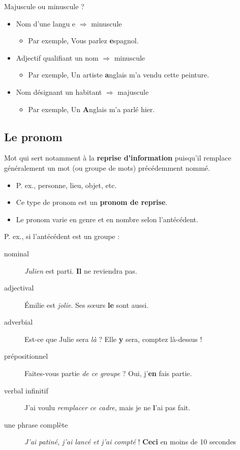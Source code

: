 \documentclass[10pt, french]{article}
\begin{document}
\begin{multicols*}{2}
\begin{definitionNOHFILLsub}
Majuscule ou minuscule ?
\begin{itemize}
	\item	Nom d'une langu	e $\Rightarrow$ minuscule
		\begin{itemize}
		\item	Par exemple, Vous parlez \textbf{e}spagnol.
		\end{itemize}
	\item	Adjectif qualifiant un nom $\Rightarrow$ minuscule
		\begin{itemize}
		\item	Par exemple, Un artiste \textbf{a}nglais m'a vendu cette peinture.
		\end{itemize}
	\item	Nom désignant un habitant $\Rightarrow$ majuscule
		\begin{itemize}
		\item	Par exemple, Un \textbf{A}nglais m'a parlé hier.
		\end{itemize}
\end{itemize}
\end{definitionNOHFILLsub}


\columnbreak
\subsection{Le pronom}\label{sec:classes-pronom}
\begin{definitionNOHFILL}[Le pronom]
Mot qui sert notamment à la \textbf{reprise d'information} puisqu'il remplace généralement un mot (ou groupe de mots) précédemment nommé.

\begin{itemize}
	\item	P. ex., personne, lieu, objet, etc.
	\item	Ce  type de pronom est un \textbf{pronom de reprise}.
	\item	Le pronom varie en genre et en nombre selon l'antécédent.
\end{itemize}
\end{definitionNOHFILL}

P. ex., si l'antécédent est un groupe :
\begin{description}
	\item[nominal]	\textit{Julien} est parti. \textbf{Il} ne reviendra pas.
	\item[adjectival]	Émilie est \textit{jolie}. Ses sœurs \textbf{le} sont aussi.
	\item[adverbial]	Est-ce que Julie sera \textit{là} ? Elle \textbf{y} sera, comptez là-dessus ! 
	\item[prépositionnel]	Faites-vous partie \textit{de ce groupe} ? Oui, j'\textbf{en} fais partie.
	\item[verbal infinitif]	J'ai voulu \textit{remplacer ce cadre}, mais je ne \textbf{l}'ai pas fait.
	\item[une phrase complète]	\textit{J'ai patiné, j'ai lancé et j'ai compté} ! \textbf{Ceci} en moins de 10 secondes
\end{description}


\end{multicols*}
\end{document}
